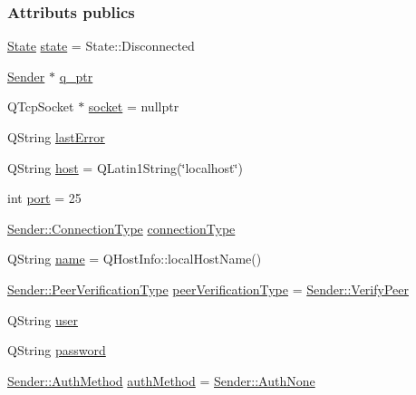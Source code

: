 \subsubsection*{Attributs publics}
\begin{DoxyCompactItemize}
\item 
\hyperlink{class_simple_mail_1_1_sender_private_ae09befddf0fae8e8f2ea153ead2b8b0a}{State} \hyperlink{class_simple_mail_1_1_sender_private_af73e80fdae8024d12714f6f3a1cc1e23}{state} = State\+::\+Disconnected
\item 
\hyperlink{class_simple_mail_1_1_sender}{Sender} $\ast$ \hyperlink{class_simple_mail_1_1_sender_private_a3cb37d3d22dc1a6a9ddff25708ed1172}{q\+\_\+ptr}
\item 
Q\+Tcp\+Socket $\ast$ \hyperlink{class_simple_mail_1_1_sender_private_a223cab47555a39f45f30569328fa20bc}{socket} = nullptr
\item 
Q\+String \hyperlink{class_simple_mail_1_1_sender_private_a90ae4ff740007836307ede01aad3a277}{last\+Error}
\item 
Q\+String \hyperlink{class_simple_mail_1_1_sender_private_a90e5dacf8918960f7f1ac89d476c00a2}{host} = Q\+Latin1\+String(\char`\"{}localhost\char`\"{})
\item 
int \hyperlink{class_simple_mail_1_1_sender_private_a6de1c85bd163d9916a4f24ef91926d4c}{port} = 25
\item 
\hyperlink{class_simple_mail_1_1_sender_a89e6a9572b306441237f6b6635729d1a}{Sender\+::\+Connection\+Type} \hyperlink{class_simple_mail_1_1_sender_private_a2d09eb5d137213e97f10228f8ed68134}{connection\+Type}
\item 
Q\+String \hyperlink{class_simple_mail_1_1_sender_private_a9daecd69dd0c84595a9c3288f98094b4}{name} = Q\+Host\+Info\+::local\+Host\+Name()
\item 
\hyperlink{class_simple_mail_1_1_sender_acfbcf388ab7c26cd41c5c77601fe8804}{Sender\+::\+Peer\+Verification\+Type} \hyperlink{class_simple_mail_1_1_sender_private_ab6854bd0a124acdc3e21aef40e59c41a}{peer\+Verification\+Type} = \hyperlink{class_simple_mail_1_1_sender_acfbcf388ab7c26cd41c5c77601fe8804ac24a70d89382bb95b91501222056c389}{Sender\+::\+Verify\+Peer}
\item 
Q\+String \hyperlink{class_simple_mail_1_1_sender_private_ac3efab988a41e60a0a56c29a1d5b04ed}{user}
\item 
Q\+String \hyperlink{class_simple_mail_1_1_sender_private_aac5b192258bcf97c2249fc944c17ee32}{password}
\item 
\hyperlink{class_simple_mail_1_1_sender_af50defb714bc3e95f47c71a9ba6ee6bb}{Sender\+::\+Auth\+Method} \hyperlink{class_simple_mail_1_1_sender_private_afd60fe3edc740b9624746316ad798647}{auth\+Method} = \hyperlink{class_simple_mail_1_1_sender_af50defb714bc3e95f47c71a9ba6ee6bba1dd1824451d663ee54b5a528cd8ced74}{Sender\+::\+Auth\+None}

\end{DoxyCompactItemize}

